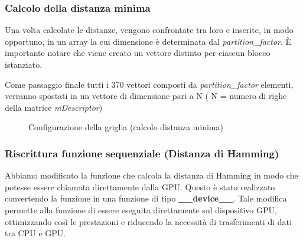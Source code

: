 \documentclass[12pt,a4paper]{report}
\begin{document}
\subsubsection{Calcolo della distanza minima} \label{calcolo-distanza-minima}

Una volta calcolate le distanze, vengono confrontate tra loro e inserite, in modo opportuno, in un array la cui dimensione è determinata dal \textit{partition\_factor}.
È importante notare che viene creato un vettore distinto per ciascun blocco istanziato. 

Come passaggio finale tutti i 370 vettori composti da \textit{partition\_factor} elementi, verranno spostati in un vettore di dimensione pari a N ( N = numero di righe della matrice \textit{mDescriptor})



\begin{figure}[H]
    \centering
    \caption{Configurazione della griglia (calcolo distanza minima) }
\end{figure}

\subsubsection{Riscrittura funzione sequenziale (Distanza di Hamming) }

Abbiamo modificato la funzione che calcola la distanza di Hamming in modo che potesse essere chiamata direttamente dalla GPU. Questo è stato realizzato convertendo la funzione in una funzione di tipo \textbf{\_\_device\_\_}. Tale modifica permette alla funzione di essere eseguita direttamente sul dispositivo GPU, ottimizzando così le prestazioni e riducendo la necessità di trasferimenti di dati tra CPU e GPU.
\end{document}
